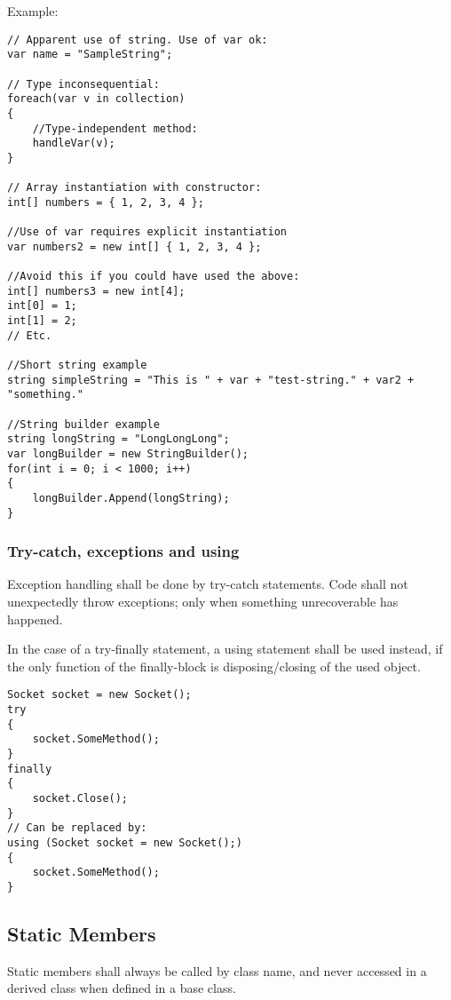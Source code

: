 \documentclass[12pt, a4paper]{article}
\begin{document}
Example:
\begin{lstlisting}
// Apparent use of string. Use of var ok:
var name = "SampleString";

// Type inconsequential:
foreach(var v in collection)
{
	//Type-independent method:
	handleVar(v);
}

// Array instantiation with constructor:
int[] numbers = { 1, 2, 3, 4 };

//Use of var requires explicit instantiation
var numbers2 = new int[] { 1, 2, 3, 4 };

//Avoid this if you could have used the above:
int[] numbers3 = new int[4];
int[0] = 1;
int[1] = 2;
// Etc.

//Short string example
string simpleString = "This is " + var + "test-string." + var2 + "something."

//String builder example
string longString = "LongLongLong";
var longBuilder = new StringBuilder();
for(int i = 0; i < 1000; i++)
{
	longBuilder.Append(longString);
}

\end{lstlisting}


\subsubsection{Try-catch, exceptions and using}
Exception handling shall be done by try-catch statements.
Code shall not unexpectedly throw exceptions; only when something unrecoverable has happened.

In the case of a try-finally statement, a using statement shall be used instead, if the only function of
the finally-block is disposing/closing of the used object.
\\
\begin{lstlisting}
Socket socket = new Socket();
try
{
	socket.SomeMethod();
}
finally
{
	socket.Close();
}
// Can be replaced by:
using (Socket socket = new Socket();)
{
	socket.SomeMethod();
}
\end{lstlisting}

\subsection{Static Members}
Static members shall always be called by class name, and never accessed in a derived class when defined in a base class.
\end{document}
